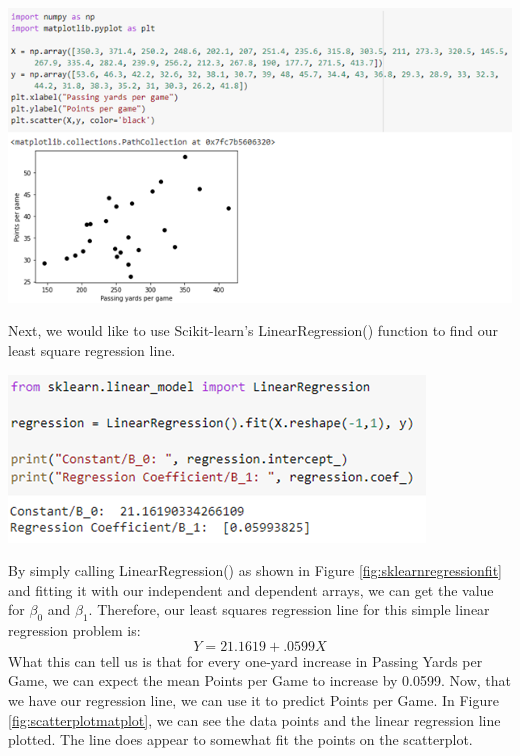 \documentclass[a4paper,12pt]{report}
\begin{document}
\begin{center}
    \captionsetup{type=figure}
    \includegraphics[width=.9\linewidth]{media/scatterplotmatplot.png}
    \label{fig:scatterplotmatplot}
\end{center}

Next, we would like to use Scikit-learn’s LinearRegression() function to find our least square regression line.

\begin{center}
    \captionsetup{type=figure}
    \includegraphics[width=.9\linewidth]{media/sklearnregressionfit.png}
    \label{fig:sklearnregressionfit}
\end{center}

By simply calling LinearRegression() as shown in Figure \ref{fig:sklearnregressionfit} and fitting it with our independent and dependent arrays, we can get the value for $\beta_0$ and $\beta_1$. Therefore, our least squares regression line for this simple linear regression problem is:
$$Y=21.1619+.0599X$$
What this can tell us is that for every one-yard increase in Passing Yards per Game, we can expect the mean Points per Game to increase by 0.0599. Now, that we have our regression line, we can use it to predict Points per Game. In Figure \ref{fig:scatterplotmatplot}, we can see the data points and the linear regression line plotted. The line does appear to somewhat fit the points on the scatterplot. 
\end{document}
